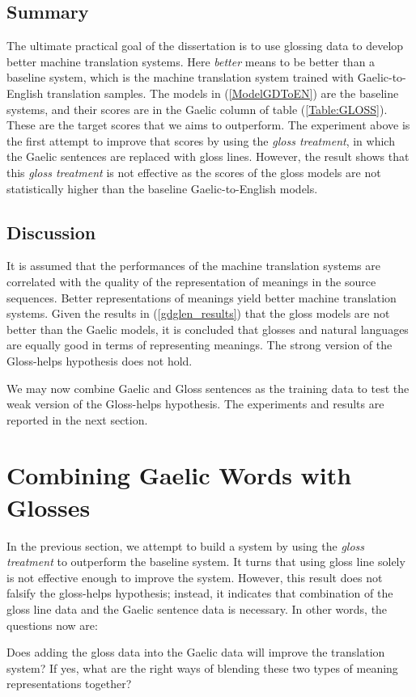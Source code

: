 \documentclass[a4paper]{article}
\begin{document}
\subsection{Summary}
The ultimate practical goal of the dissertation is to use glossing data to develop better machine translation systems. Here \textit{better} means to be better than a baseline system, which is the machine translation system trained with Gaelic-to-English translation samples. The models in (\ref{ModelGDToEN}) are the baseline systems, and their scores are in the Gaelic column of table (\ref{Table:GLOSS}). These are the target scores that we aims to outperform. The experiment above is the first attempt to improve that scores by using the \textit{gloss treatment}, in which the Gaelic sentences are replaced with gloss lines.  However, the result shows that this \textit{gloss treatment} is not effective as the scores of the gloss models are not statistically higher than the baseline Gaelic-to-English models.  

\subsection{Discussion}
It is assumed that the performances of the machine translation systems are correlated with the quality of the representation of meanings in the source sequences. Better representations of meanings yield better machine translation systems. Given the results in (\ref{gdglen_results}) that the gloss models are not better than the Gaelic models, it is concluded that glosses and natural languages are equally good in terms of representing meanings. The strong version of the Gloss-helps hypothesis does not hold. 

We may now combine Gaelic and Gloss sentences as the training data to test the weak version of the Gloss-helps hypothesis. The experiments and results are reported in the next section. 

\section{Combining Gaelic Words with Glosses}\label{gd_plus_gl_to_en}

In the previous section, we attempt to build a system by using the \textit{gloss treatment} to outperform the baseline system. It turns that using gloss line solely is not effective enough to improve the system. However, this result does not falsify the gloss-helps hypothesis; instead, it indicates that combination of the gloss line data and the Gaelic sentence data is necessary. In other words, the questions now are: 
\begin{exe}
	\ex 
	\begin{xlist}
		\ex Does adding the gloss data into the Gaelic data will improve the translation system? 
		\ex If yes, what are the right ways of blending these two types of meaning representations together? 
	\end{xlist}	
\end{exe}
\end{document}
